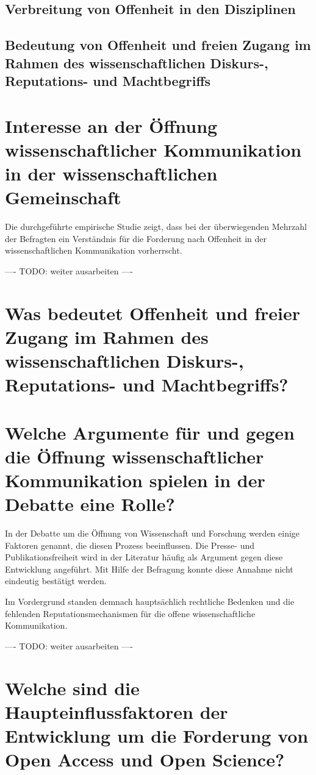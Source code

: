 \subsection{Verbreitung von Offenheit in den Disziplinen}

\subsection{Bedeutung von Offenheit und freien Zugang im Rahmen des wissenschaftlichen Diskurs-, Reputations- und Machtbegriffs}

\section{Interesse an der Öffnung wissenschaftlicher Kommunikation in der wissenschaftlichen Gemeinschaft}

Die durchgeführte empirische Studie zeigt, dass bei der überwiegenden Mehrzahl der Befragten ein Verständnis für die Forderung nach Offenheit in der wissenschaftlichen Kommunikation vorherrscht.

---- TODO: weiter ausarbeiten ----

\section{Was bedeutet Offenheit und freier Zugang im Rahmen des wissenschaftlichen Diskurs-, Reputations- und Machtbegriffs?}

\section{Welche Argumente für und gegen die Öffnung wissenschaftlicher Kommunikation spielen in der Debatte eine Rolle?}

In der Debatte um die Öffnung von Wissenschaft und Forschung werden einige Faktoren genannt, die diesen Prozess beeinflussen. Die Presse- und Publikationsfreiheit wird in der Literatur häufig als Argument gegen diese Entwicklung angeführt. Mit Hilfe der Befragung konnte diese Annahme nicht eindeutig bestätigt werden.

Im Vordergrund standen demnach hauptsächlich rechtliche Bedenken und die fehlenden Reputationsmechanismen für die offene wissenschaftliche Kommunikation.

---- TODO: weiter ausarbeiten ----

\section{Welche sind die Haupteinflussfaktoren der Entwicklung um die Forderung von Open Access und Open Science?}

